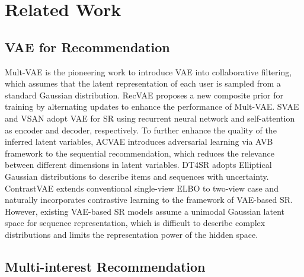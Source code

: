\section{Related Work}
\vspace{-0.2cm} \subsection{VAE for Recommendation}

 Mult-VAE \cite{MultiVAE} is the pioneering work to introduce VAE into collaborative filtering, which assumes that the latent representation of each user is sampled from a standard Gaussian distribution. RecVAE \cite{RecVAE} proposes a new composite prior for training by alternating updates to enhance the performance of Mult-VAE. SVAE \cite{SVAE} and VSAN \cite{VSAN} adopt VAE for SR using recurrent neural network and self-attention as encoder and decoder, respectively. To further enhance the quality of the inferred latent variables, ACVAE \cite{ACVAE} introduces adversarial learning via AVB framework to the sequential recommendation, which reduces the relevance between different dimensions in latent variables. DT4SR \cite{DT4SR} adopts Elliptical Gaussian distributions to describe items and sequences with uncertainty. ContrastVAE \cite{ContrastVAE} extends conventional single-view ELBO to two-view case and naturally incorporates contrastive learning to the framework of VAE-based SR. However, existing VAE-based SR models assume a unimodal Gaussian latent space for sequence representation, which is difficult to describe complex distributions and limits the representation power of the hidden space. 

\vspace{-0.2cm} \subsection{Multi-interest Recommendation} 

